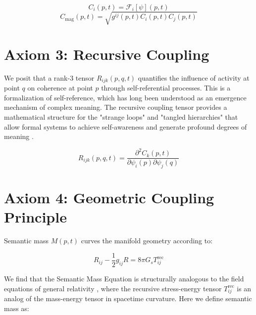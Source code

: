 \begin{equation}
C_i(p,t) = \mathcal{F}_i[\psi](p,t)
\end{equation}
\begin{equation}
C_{\text{mag}}(p,t) = \sqrt{g^{ij}(p,t) C_i(p,t) C_j(p,t)}
\end{equation}


\section{Axiom 3: Recursive Coupling}\label{axiom_3}

We posit that a rank-3 tensor \(R_{ijk}(p,q,t)\) quantifies the influence of activity at point \(q\) on coherence at point \(p\) through self-referential processes. This is a formalization of self-reference, which has long been understood as an emergence mechanism of complex meaning. The recursive coupling tensor provides a mathematical structure for the "strange loops" and "tangled hierarchies" that allow formal systems to achieve self-awareness and generate profound degrees of meaning \autocite{Hofstadter1979}.

\begin{equation}
R_{ijk}(p,q,t) = \frac{\partial^2 C_k(p,t)}{\partial \psi_i(p) \partial \psi_j(q)}
\end{equation}


\section{Axiom 4: Geometric Coupling Principle}\label{axiom_4}

Semantic mass \(M(p,t)\) curves the manifold geometry according to:

\begin{equation}\label{eq:rft_field_equation_axiom}
R_{ij} - \frac{1}{2}g_{ij}R = 8\pi G_s T^{\text{rec}}_{ij}
\end{equation}

We find that the Semantic Mass Equation is structurally analogous to the field equations of general relativity \autocite{Einstein1915, MisnerThorneWheeler1973, Wald1984}, where the recursive stress-energy tensor \(T^{\text{rec}}_{ij}\) is an analog of the mass-energy tensor in spacetime curvature. Here we define semantic mass as:


